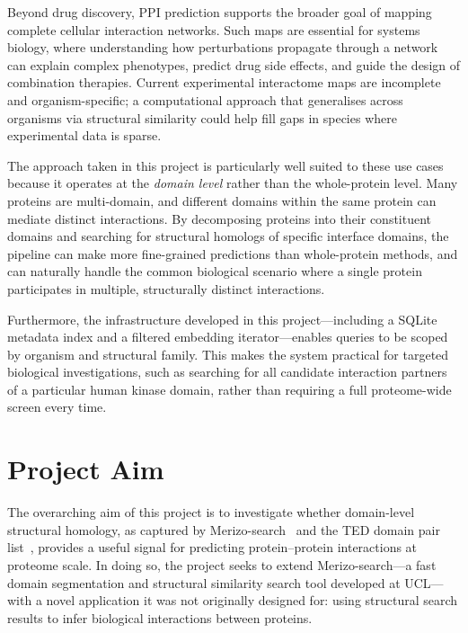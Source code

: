 Beyond drug discovery, PPI prediction supports the broader goal of mapping complete cellular interaction networks.
Such maps are essential for systems biology, where understanding how perturbations propagate through a network can explain complex phenotypes, predict drug side effects, and guide the design of combination therapies.
Current experimental interactome maps are incomplete and organism-specific; a computational approach that generalises across organisms via structural similarity could help fill gaps in species where experimental data is sparse.

The approach taken in this project is particularly well suited to these use cases because it operates at the \emph{domain level} rather than the whole-protein level.
Many proteins are multi-domain, and different domains within the same protein can mediate distinct interactions.
By decomposing proteins into their constituent domains and searching for structural homologs of specific interface domains, the pipeline can make more fine-grained predictions than whole-protein methods, and can naturally handle the common biological scenario where a single protein participates in multiple, structurally distinct interactions.

Furthermore, the infrastructure developed in this project---including a SQLite metadata index and a filtered embedding iterator---enables queries to be scoped by organism and structural family.
This makes the system practical for targeted biological investigations, such as searching for all candidate interaction partners of a particular human kinase domain, rather than requiring a full proteome-wide screen every time.


\section{Project Aim}
\label{sec:project-aim}

The overarching aim of this project is to investigate whether domain-level structural homology, as captured by Merizo-search~\cite{merizo_search} and the TED domain pair list~\cite{ted_dataset}, provides a useful signal for predicting protein--protein interactions at proteome scale.
In doing so, the project seeks to extend Merizo-search---a fast domain segmentation and structural similarity search tool developed at UCL---with a novel application it was not originally designed for: using structural search results to infer biological interactions between proteins.

